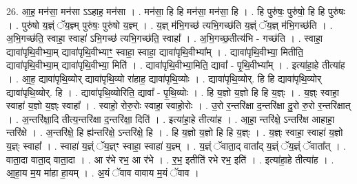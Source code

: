 \documentclass[17pt]{extarticle}
\begin{document}
26. आ॒ह॒ मन॑सा॒ मन॑सा ऽऽहाह॒ मन॑सा । . मन॑सा॒ हि हि मन॑सा॒ मन॑सा॒ हि । . हि पुरु॑षः॒ पुरु॑षो॒ हि हि पुरु॑षः । . पुरु॑षो य॒ज्ञ्ं ॅय॒ज्ञ्म् पुरु॑षः॒ पुरु॑षो य॒ज्ञ्म् । . य॒ज्ञ् म॑भि॒गच्छ॑ त्यभि॒गच्छ॑ति य॒ज्ञ्ं ॅय॒ज्ञ् म॑भि॒गच्छ॑ति । . अ॒भि॒गच्छ॑ति॒ स्वाहा॒ स्वाहा॑ ऽभि॒गच्छ॑ त्यभि॒गच्छ॑ति॒ स्वाहा᳚ । . अ॒भि॒गच्छ॒तीत्य॑भि - गच्छ॑ति । . स्वाहा॒ द्यावा॑पृथि॒वीभ्या॒म् द्यावा॑पृथि॒वीभ्याꣳ॒॒ स्वाहा॒ स्वाहा॒ द्यावा॑पृथि॒वीभ्या᳚म् । . द्यावा॑पृथि॒वीभ्या॒ मितीति॒ द्यावा॑पृथि॒वीभ्या॒म् द्यावा॑पृथि॒वीभ्या॒ मिति॑ । . द्यावा॑पृथि॒वीभ्या॒मिति॒ द्यावा᳚ - पृ॒थि॒वीभ्या᳚म् । . इत्या॑हा॒हे तीत्या॑ह । . आ॒ह॒ द्यावा॑पृथि॒व्योर् द्यावा॑पृथि॒व्यो रा॑हाह॒ द्यावा॑पृथि॒व्योः । . द्यावा॑पृथि॒व्योर्. हि हि द्यावा॑पृथि॒व्योर् द्यावा॑पृथि॒व्योर्. हि । . द्यावा॑पृथि॒व्योरिति॒ द्यावा᳚ - पृ॒थि॒व्योः । . हि य॒ज्ञो य॒ज्ञो हि हि य॒ज्ञ्ः । . य॒ज्ञ्ः स्वाहा॒ स्वाहा॑ य॒ज्ञो य॒ज्ञ्ः स्वाहा᳚ । . स्वाहो॒ रोरु॒रोः स्वाहा॒ स्वाहो॒रोः । . उ॒रो र॒न्तरि॑क्षा द॒न्तरि॑क्षा दु॒रो रु॒रो र॒न्तरि॑क्षात् । . अ॒न्तरि॑क्षा॒दि तीत्य॒न्तरि॑क्षा द॒न्तरि॑क्षा॒ दिति॑ । . इत्या॑हा॒हे तीत्या॑ह । . आ॒हा॒ न्तरि॑क्षे॒ ऽन्तरि॑क्ष आहाहा॒ न्तरि॑क्षे । . अ॒न्तरि॑क्षे॒ हि ह्य॑न्तरि॑क्षे॒ ऽन्तरि॑क्षे॒ हि । . हि य॒ज्ञो य॒ज्ञो हि हि य॒ज्ञ्ः । . य॒ज्ञ्ः स्वाहा॒ स्वाहा॑ य॒ज्ञो य॒ज्ञ्ः स्वाहा᳚ । . स्वाहा॑ य॒ज्ञ्ं ॅय॒ज्ञ्ꣳ स्वाहा॒ स्वाहा॑ य॒ज्ञ्म् । . य॒ज्ञ्ं ॅवाता॒द् वाता᳚द् य॒ज्ञ्ं ॅय॒ज्ञ्ं ॅवाता᳚त् । . वाता॒दा वाता॒द् वाता॒दा । . आ र॑भे रभ॒ आ र॑भे । . र॒भ॒ इतीति॑ रभे रभ॒ इति॑ । . इत्या॑हा॒हे तीत्या॑ह । . आ॒हा॒य म॒य मा॑हा हा॒यम् । . अ॒यं ॅवाव वावाय म॒यं ॅवाव । \newline
\end{document}
